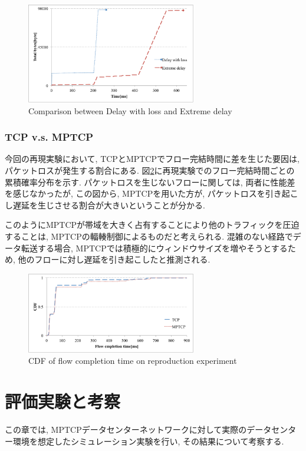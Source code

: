 \documentclass[10pt, a4paper, twocolumn]{jsarticle}
\begin{document}
\begin{figure}[h]
    \begin{center}
    \includegraphics[autoebb, width=210pt]{./img/loss.pdf}
    \caption{Comparison between Delay with loss and Extreme delay}
    \label{fig:delay_loss}
    \end{center}
\end{figure}

\subsubsection{TCP v.s. MPTCP}
今回の再現実験において, TCPとMPTCPでフロー完結時間に差を生じた要因は, パケットロスが発生する割合にある.
図\ref{fig:cdf}に再現実験でのフロー完結時間ごとの累積確率分布を示す.
パケットロスを生じないフローに関しては, 両者に性能差を感じなかったが, この図から, MPTCPを用いた方が,
パケットロスを引き起こし遅延を生じさせる割合が大きいということが分かる.

このようにMPTCPが帯域を大きく占有することにより他のトラフィックを圧迫することは, MPTCPの輻輳制御によるものだと考えられる.
混雑のない経路でデータ転送する場合, MPTCPでは積極的にウィンドウサイズを増やそうとするため, 他のフローに対し遅延を引き起こしたと推測される.


\begin{figure}[h]
    \begin{center}
    \includegraphics[autoebb, width=210pt]{./img/cdf_rep.pdf}
    \caption{CDF of flow completion time on reproduction experiment}
    \label{fig:cdf}
    \end{center}
\end{figure}

\section{評価実験と考察}
\label{sec:evaluation}
この章では, MPTCPデータセンターネットワークに対して実際のデータセンター環境を想定したシミュレーション実験を行い, その結果について考察する.
\end{document}
